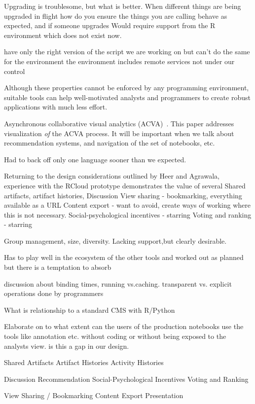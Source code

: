Upgrading is troublesome, but what is better. When different things are being
upgraded in flight how do you ensure the things you are calling behave as
expected, and if someone upgrades 
Would require support from the R environment which does not exist now.

have only the right version of the script we are working on but
can't do the same for the environment
the environment includes remote services not under our control

Although these properties cannot be enforced by any programming environment,
suitable tools can help well-motivated analysts and programmers to create
robust applications with much less effort.

Asynchronous collaborative visual analytics
(ACVA)~\cite{Chen:2011:SEC}. This paper addresses visualization
\emph{of} the ACVA process. It will be important when we talk about
recommendation systems, and navigation of the set of notebooks, etc.

Had to back off only one language sooner than we expected.

Returning to the design considerations outlined by Heer and Agrawala, experience with the RCloud prototype demonstrates the value of several
Shared artifacts, artifact histories,
Discussion
View sharing - bookmarking, everything available as a URL
Content export - want to avoid, create ways of working where this is not necessary.
Social-psychological incentives - starring
Voting and ranking - starring

Group management, size, diversity.  Lacking support,but clearly desirable.

Has to play well in the ecosystem of the other tools and worked out as planned but there is a temptation to absorb

discussion about binding times, running vs.caching.
transparent vs. explicit operations done by programmers

What is relationship to a standard CMS with R/Python

Elaborate on to what extent can the users of the production notebooks use the tools like annotation etc. without coding or without being exposed to the analysts view. is this a gap in our design.

Shared Artifacts
Artifact Histories
Activity Histories


Discussion
Recommendation
Social-Psychological Incentives
Voting and Ranking


View Sharing / Bookmarking
Content Export
Presentation

